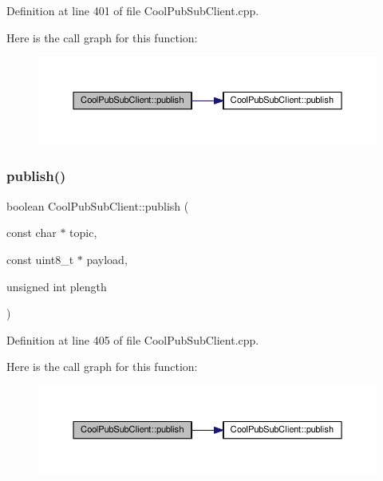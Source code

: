 Definition at line 401 of file Cool\+Pub\+Sub\+Client.\+cpp.

Here is the call graph for this function\+:\nopagebreak
\begin{figure}[H]
\begin{center}
\leavevmode
\includegraphics[width=350pt]{class_cool_pub_sub_client_a0b01cef98af0b57d8da4df373e196448_cgraph}
\end{center}
\end{figure}
\mbox{\label{class_cool_pub_sub_client_abf184c0968a6655b68b5fdfbbc0c87d1}} 
\subsubsection{\texorpdfstring{publish()}{publish()}\hspace{0.1cm}{\footnotesize\ttfamily [3/4]}}
{\footnotesize\ttfamily boolean Cool\+Pub\+Sub\+Client\+::publish (\begin{DoxyParamCaption}\item[{const char $\ast$}]{topic,  }\item[{const uint8\+\_\+t $\ast$}]{payload,  }\item[{unsigned int}]{plength }\end{DoxyParamCaption})}



Definition at line 405 of file Cool\+Pub\+Sub\+Client.\+cpp.

Here is the call graph for this function\+:\nopagebreak
\begin{figure}[H]
\begin{center}
\leavevmode
\includegraphics[width=350pt]{class_cool_pub_sub_client_abf184c0968a6655b68b5fdfbbc0c87d1_cgraph}
\end{center}
\end{figure}
\mbox{\label{class_cool_pub_sub_client_adef968760eb87b70e3fed03e60da76f7}} 

